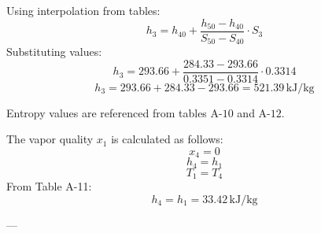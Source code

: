 Using interpolation from tables:  
\[
h_3 = h_{40} + \frac{h_{50} - h_{40}}{S_{50} - S_{40}} \cdot S_3
\]
Substituting values:  
\[
h_3 = 293.66 + \frac{284.33 - 293.66}{0.3351 - 0.3314} \cdot 0.3314
\]
\[
h_3 = 293.66 + 284.33 - 293.66 = 521.39 \, \text{kJ/kg}
\]  

Entropy values are referenced from tables \( \text{A-10} \) and \( \text{A-12} \).

The vapor quality \( x_1 \) is calculated as follows:  
\[
x_4 = 0
\]
\[
h_4 = h_1
\]
\[
T_1 = T_4
\]
From Table A-11:  
\[
h_4 = h_1 = 33.42 \, \text{kJ/kg}
\]

---